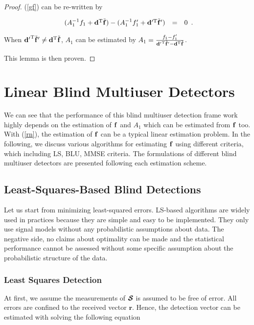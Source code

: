 \documentclass[a4paper,11pt,fleqn]{article}
\newcommand{\br}{{\mathbf r}}
\newcommand{\bd}{{\bf d}}
\newcommand{\bbf}{{\bf f}}
\newcommand{\bcS}{{\mbox {\boldmath ${\cal S}$}}}
\begin{document}
\begin{proof}

(\ref{gf}) can be re-written by

\begin{equation}
\begin{array}{rcl}
(A_1^{-1}f_{1}+\bd^{\rm T}\tilde{\bbf})- (A_1^{-1}f'_{1}+\bd'^{\rm
T}\tilde{\bbf}')&=&0
\end{array}.\label{gf}
\end{equation}

\noindent When ${\bd'}^{\rm T}\tilde{\bbf}'\neq {\bd}^{\rm
T}\tilde{\bbf}$, $A_1$ can be estimated by $A_1={ f_{1} - f'_{1}
\over {\bd'}^{\rm T}\tilde{\bbf}' - {\bd}^{\rm T}\tilde{\bbf}}$.


 This lemma is then proven.
\end{proof}

\section{Linear Blind Multiuser Detectors\label{LBD}}

We can see that the performance of this blind multiuser detection
frame work highly depends on the estimation of $\bbf$ and $A_1$
which can be estimated from $\bbf$ too. With (\ref{rn}), the
estimation of $\bbf$ can be a typical linear estimation problem.
In the following, we discuss various algorithms for estimating
$\bbf$ using different criteria, which including LS, BLU, MMSE
criteria. The formulations of different blind multiuser detectors
are presented following each estimation scheme.


\subsection{Least-Squares-Based Blind Detections}
Let us start from minimizing least-squared errors. LS-based
algorithms are widely used in practices because they are simple
and easy to be implemented. They only use signal models without
any probabilistic assumptions about data. The negative side, no
claims about optimality can be made and the statistical
performance cannot be assessed without some specific assumption
about the probabilistic structure of the data.

\subsubsection{ Least Squares Detection }
At first, we assume the measurements of $\bcS$ is assumed to be
free of error. All errors are confined to the received vector
$\br$. Hence, the detection vector can be estimated with solving
the following equation
\end{document}
